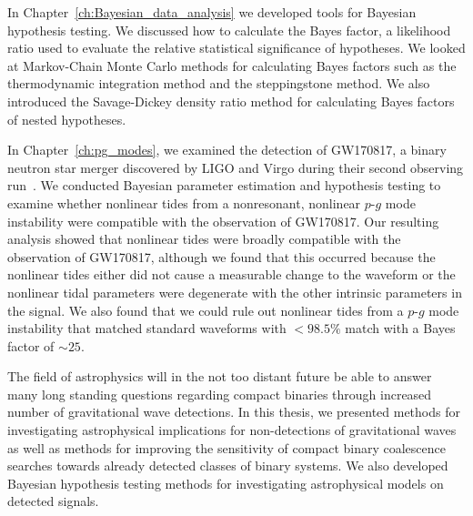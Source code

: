 In Chapter~\ref{ch:Bayesian_data_analysis} we developed tools for Bayesian hypothesis testing. We discussed how to calculate the Bayes factor, a likelihood ratio used to evaluate the relative statistical significance of hypotheses. We looked at Markov-Chain Monte Carlo methods for calculating Bayes factors such as the thermodynamic integration method and the steppingstone method. We also introduced the Savage-Dickey density ratio method for calculating Bayes factors of nested hypotheses.

In Chapter~\ref{ch:pg_modes}, we examined the detection of GW170817, a binary neutron star merger discovered by LIGO and Virgo during their second observing run~\cite{TheLIGOScientific:2017qsa}. We conducted Bayesian parameter estimation and hypothesis testing to examine whether nonlinear tides from a nonresonant, nonlinear $p$-$g$ mode instability were compatible with the observation of GW170817. Our resulting analysis showed that nonlinear tides were broadly compatible with the observation of GW170817, although we found that this occurred because the nonlinear tides either did not cause a measurable change to the waveform or the nonlinear tidal parameters were degenerate with the other intrinsic parameters in the signal. We also found that we could rule out nonlinear tides from a $p$-$g$ mode instability that matched standard waveforms with $< 98.5 \%$ match with a Bayes factor of $\sim 25$.

The field of astrophysics will in the not too distant future be able to answer many long standing questions regarding compact binaries through increased number of gravitational wave detections. In this thesis, we presented methods for investigating astrophysical implications for non-detections of gravitational waves as well as methods for improving the sensitivity of compact binary coalescence searches towards already detected classes of binary systems. We also developed Bayesian hypothesis testing methods for investigating astrophysical models on detected signals.
